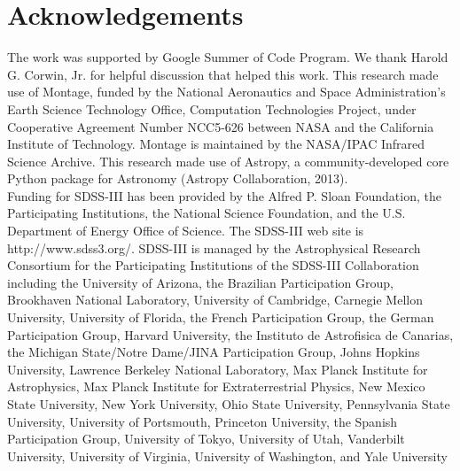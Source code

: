 \documentclass[5p]{elsarticle}
\begin{document}
\section*{Acknowledgements}
\footnotesize
\indent The work was supported by Google Summer of Code Program. We thank Harold G. Corwin, Jr. for helpful discussion that helped this work. This research made use of Montage, funded by the National Aeronautics and Space Administration's Earth Science Technology Office, Computation Technologies Project, under Cooperative Agreement Number NCC5-626 between NASA and the California Institute of Technology. Montage is maintained by the NASA/IPAC Infrared Science Archive. This research made use of Astropy, a community-developed core Python package for Astronomy (Astropy Collaboration, 2013).
\\
\indent  Funding for SDSS-III has been provided by the Alfred P. Sloan Foundation, the Participating Institutions, the National Science Foundation, and the U.S. Department of Energy Office of Science. The SDSS-III web site is http://www.sdss3.org/. SDSS-III is managed by the Astrophysical Research Consortium for the Participating Institutions of the SDSS-III Collaboration including the University of Arizona, the Brazilian Participation Group, Brookhaven National Laboratory, University of Cambridge, Carnegie Mellon University, University of Florida, the French Participation Group, the German Participation Group, Harvard University, the Instituto de Astrofisica de Canarias, the Michigan State/Notre Dame/JINA Participation Group, Johns Hopkins University, Lawrence Berkeley National Laboratory, Max Planck Institute for Astrophysics, Max Planck Institute for Extraterrestrial Physics, New Mexico State University, New York University, Ohio State University, Pennsylvania State University, University of Portsmouth, Princeton University, the Spanish Participation Group, University of Tokyo, University of Utah, Vanderbilt University, University of Virginia, University of Washington, and Yale University


  
\end{document}
